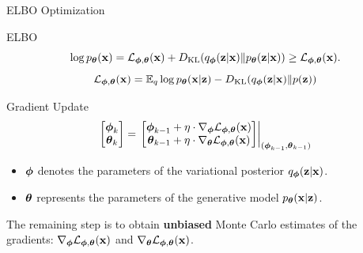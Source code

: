 \documentclass{beamer}
\begin{document}
\begin{frame}{ELBO Optimization}
	\begin{block}{ELBO}
		\vspace{-0.3cm}
		\[
			\log \pt(\bx) = \cL_{\bphi, \btheta}(\bx) + \KL(q_{\bphi}(\bz| \bx) \| \pt(\bz|\bx)) \geq \cL_{\bphi, \btheta}(\bx).
		\]
		\[
		 	\cL_{\bphi, \btheta}(\bx) = \bbE_{q} \log \pt(\bx | \bz) - \KL(q_{\bphi}(\bz| \bx) \| p(\bz))
		\]
		\vspace{-0.5cm}
	\end{block}
	\eqpause
	\begin{block}{Gradient Update}
		\[
			\begin{bmatrix}
				\bphi_k \\
				\btheta_k
			\end{bmatrix}
			= \left.
			\begin{bmatrix}
				\bphi_{k-1} + \eta \cdot \nabla_{\bphi} \cL_{\bphi, \btheta}(\bx) \\
				\btheta_{k-1} + \eta \cdot \nabla_{\btheta} \cL_{\bphi, \btheta}(\bx)
			\end{bmatrix}
			\right|_{(\bphi_{k-1}, \btheta_{k-1})}
		\]
		\begin{itemize}
			\item $\bphi$ denotes the parameters of the variational posterior $q_{\bphi}(\bz| \bx)$.
			\item $\btheta$ represents the parameters of the generative model $\pt(\bx | \bz)$.
		\end{itemize}
	\end{block}
	\eqpause
	The remaining step is to obtain \textbf{unbiased} Monte Carlo estimates of the gradients: $\nabla_{\bphi} \cL_{\bphi, \btheta}(\bx)$ and $\nabla_{\btheta} \cL_{\bphi, \btheta}(\bx)$. 
\end{frame}
\end{document}
